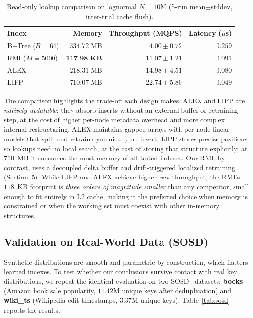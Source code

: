 \documentclass[sigconf,nonacm]{acmart}
\begin{document}
\begin{table}[t]
\centering
\caption{Read-only lookup comparison on lognormal $N{=}10$M (5-run mean$\pm$stddev, inter-trial cache flush).}
\label{tab:baselines}
\begin{tabular}{lrrr}
\toprule
\textbf{Index} & \textbf{Memory} & \textbf{Throughput (MQPS)} & \textbf{Latency ($\mu$s)} \\
\midrule
B+Tree ($B{=}64$) & 334.72 MB & $4.00 \pm 0.72$ & $0.259$ \\
RMI ($M{=}5000$)   & \textbf{117.98 KB} & $11.07 \pm 1.21$ & $0.091$ \\
ALEX~\cite{ding2020alex}   & 218.31 MB & $14.98 \pm 4.51$ & $0.080$ \\
LIPP~\cite{wu2021lipp}     & 710.07 MB & $\mathbf{22.74 \pm 5.80}$ & $\mathbf{0.049}$ \\
\bottomrule
\end{tabular}
\end{table}

\medskip

The comparison highlights the trade-off each design makes. ALEX and LIPP are \textit{natively updatable}: they absorb inserts without an external buffer or retraining step, at the cost of higher per-node metadata overhead and more complex internal restructuring. ALEX maintains gapped arrays with per-node linear models that split and retrain dynamically on insert; LIPP stores precise positions so lookups need no local search, at the cost of storing that structure explicitly; at $710$~MB it consumes the most memory of all tested indexes. Our RMI, by contrast, uses a decoupled delta buffer and drift-triggered localized retraining (Section~5). While LIPP and ALEX achieve higher raw throughput, the RMI's $118$~KB footprint is \textit{three orders of magnitude smaller} than any competitor, small enough to fit entirely in L2 cache, making it the preferred choice when memory is constrained or when the working set must coexist with other in-memory structures.

\subsection{Validation on Real-World Data (SOSD)}
Synthetic distributions are smooth and parametric by construction, which flatters learned indexes. To test whether our conclusions survive contact with real key distributions, we repeat the identical evaluation on two SOSD~\cite{marcus2020benchmarking} datasets: \textbf{books} (Amazon book sale popularity, $11.42$M unique keys after deduplication) and \textbf{wiki\_ts} (Wikipedia edit timestamps, $3.37$M unique keys). Table~\ref{tab:sosd} reports the results.
\end{document}
